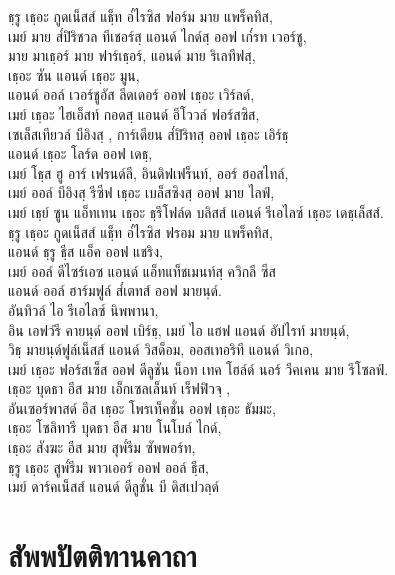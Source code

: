 ธฺรู เธฺอะ กูดเน็สส์ แธฺ็ท อ๎ไรซิส ฟอร์ม มาย แพร็คทิส,\\
เมย์ มาย ส๎ปิริชวล ทีเชอร์สฺ แอนด์ ไกด์สฺ ออฟ เก๎รท เวอร์ชู,\\
มาย มาเธฺอร์ มาย ฟาร์เธฺอร์, แอนด์ มาย ริเลทีฟสฺ,\\
เธฺอะ ซัน แอนด์ เธฺอะ มูน,\\
\vin แอนด์ ออล์ เวอร์ชูอัส ลีดเดอร์ ออฟ เธฺอะ เวิร์ลด์,\\
เมย์ เธฺอะ ไฮเอ็สท์ กอดสฺ  แอนด์ อีโววล์ ฟอร์สซิส,\\
เซเล็สเทียวล์ บีอิงสฺ , การ์เดียน ส๎ปิริทสฺ  ออฟ เธฺอะ เอิร์ธฺ\\
\vin แอนด์ เธฺอะ โลร์ด ออฟ เดธฺ,\\
เมย์ โธฺส ฮู อาร์ เฟรนด์ลี, อินดิฟเฟร็นท์, ออร์ ฮอสไทล์,\\
เมย์ ออล์ บีอิงสฺ  รีซีฟ เธฺอะ เบล็สซิงสฺ  ออฟ มาย ไลฟ์,\\
เมย์ เธฺย์ ซูน แอ็ทเทน เธฺอะ ธฺรีโฟล์ด บลิสส์ แอนด์ รีเอไลซ์ เธฺอะ เดธฺเล็สส์.\\
ธฺรู เธฺอะ กูดเน็สส์ แธฺ็ท อ๎ไรซิส ฟรอม มาย แพร็คทิส,\\
แอนด์ ธฺรู ธฺีส แอ็ค ออฟ แชริง,\\
เมย์ ออล์ ดีไซร์เอซ แอนด์ แอ็ทแท็ชเมนท์สฺ ควิกลี ซีส\\
แอนด์ ออล์ ฮาร์มฟูล์ ส๎เตทส์ ออฟ มายนฺด์.\\
อันทิวล์ ไอ รีเอไลซ์ นิพพานา,\\
อิน เอฟว์รี คายนฺด์ ออฟ เบิร์ธฺ, เมย์ ไอ แฮฟ แอนด์ อัปไรท์ มายนฺด์,\\
วิธฺ มายนฺด์ฟูล์เน็สส์ แอนด์ วิสด็อม, ออสเทอริที แอนด์ วิเกอ,\\
เมย์ เธฺอะ ฟอร์สเซ็ส ออฟ ดีลูชัน น็อท เทค โฮล์ด์ นอร์ วีคเคน มาย รีโซลฟ์.\\
เธฺอะ บุดธา อีส มาย เอ็กเซลเล็นท์ เร็ฟฟิวจฺ ,\\
อันเซอร์พาสด์ อีส เธฺอะ โพรเท็คชั่น ออฟ เธฺอะ ธัมมะ,\\
เธฺอะ โซลิทารี บุดธา อีส มาย โนโบล์ ไกด์,\\
เธฺอะ สังฆะ อีส มาย สุพ๎รีม ซัพพอร์ท,\\
ธฺรู เธฺอะ สูพ๎รีม พาวเออร์ ออฟ ออล์ ธฺีส,\\
เมย์ ดาร์คเน็สส์ แอนด์ ดีลูชั่น บี ดิสเปวลฺด์\\
\clearpage

\chapter{สัพพปัตติทานคาถา}

